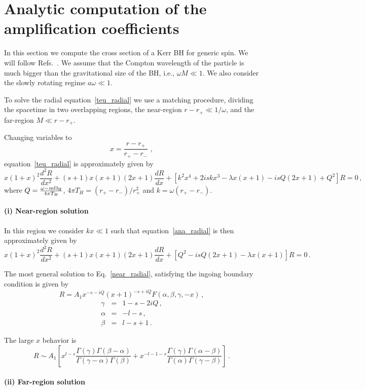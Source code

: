 \documentclass[11pt]{article}
\newcommand{\be}{\begin{equation}}
\newcommand{\ee}{\end{equation}}
\newcommand{\bea}{\begin{eqnarray}}
\newcommand{\eea}{\end{eqnarray}}
\numberwithin{equation}{section} %
\begin{document}
\section{Analytic computation of the amplification coefficients}\label{appendix_super_ana}
In this section we compute the cross section of a Kerr BH for generic spin. We will follow Refs.~\cite{Starobinski:1973,Starobinski2:1973}. We assume that the Compton wavelength of the particle is much bigger than the gravitational size of the BH, i.e., $\omega M\ll 1$. We also consider the slowly rotating regime $a\omega\ll 1$. 

To solve the radial equation~\eqref{teu_radial} we use a matching procedure, dividing the spacetime in two overlapping regions, the near-region $r-r_+\ll 1/\omega$, and the far-region $M\ll r-r_+$.

Changing variables to
%
\be
x=\frac{r-r_+}{r_+-r_-}\,\,,
\ee
%
equation~\eqref{teu_radial} is approximately given by
%
\be\label{ana_radial}
x(1+x)^2\frac{d^2R}{dx^2}+(s+1)x(x+1)(2x+1)\frac{dR}{dx}+\left[k^2x^4+2iskx^3-\lambda x(x+1)-is Q(2x+1)+Q^2\right]R=0\,,
\ee
%
where $Q=\frac{\omega-m\Omega_{\rm H}}{4\pi T_H}$, $4\pi T_H=(r_+-r_-)/r_+^2$ and $k=\omega(r_+-r_-)$.

\paragraph{(i) Near-region solution}

In this region we consider $kx\ll 1$ such that equation~\eqref{ana_radial} is then approximately given by
%
\be\label{near_radial}
x(1+x)^2\frac{d^2R}{dx^2}+(s+1)x(x+1)(2x+1)\frac{dR}{dx}+\left[Q^2-is Q(2x+1)-\lambda x(x+1)\right]R=0\,.
\ee
%


The most general solution to Eq.~\eqref{near_radial}, satisfying the ingoing boundary condition is given by
%
\be
R=A_1 x^{-s-i Q}(x+1)^{-s+iQ} F(\alpha,\beta,\gamma,-x)\,,
\ee
%
\bea
\gamma&=&1-s-2iQ\,,\\
\alpha&=&-l-s\,,\\
\beta&=&l-s+1\,.
\eea
%

The large $x$ behavior is 
%
\be\label{sol_near}
R\sim A_1\left[x^{l-s}\frac{\Gamma(\gamma)\Gamma(\beta-\alpha)}{\Gamma(\gamma-\alpha)\Gamma(\beta)}+
x^{-l-1-s}\frac{\Gamma(\gamma)\Gamma(\alpha-\beta)}{\Gamma(\alpha)\Gamma(\gamma-\beta)}\right]\,.
\ee
%


\paragraph{(ii) Far-region solution}
\end{document}
